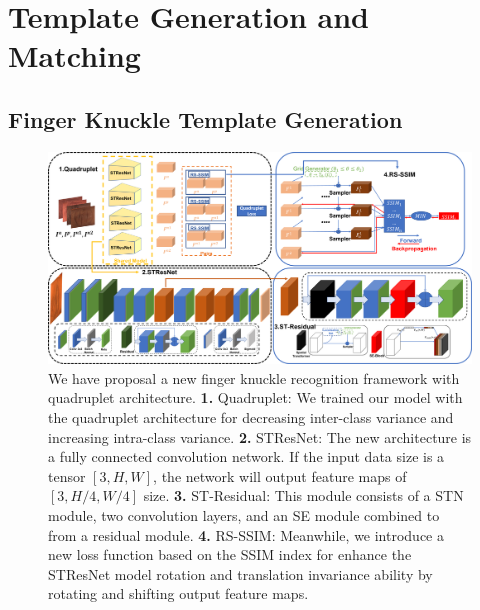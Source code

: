 \section{Template Generation and Matching\label{template-generation}}

\subsection{Finger Knuckle Template Generation\label{fk-template}}

\begin{figure}
    \centering
    \includegraphics[width=6.5in]{Figures/framework/ST-Residual/Framework.png}
    \caption{We have proposal a new finger knuckle recognition framework with quadruplet architecture. \textbf{1.} Quadruplet: We trained our model with the quadruplet architecture \cite{chen2017beyond} for decreasing inter-class variance and increasing intra-class variance. \textbf{2.} STResNet: The new architecture is a fully connected convolution network. If the input data size is a tensor $[3, H, W]$, the network will output feature maps of $[3, H/4, W/4]$ size. \textbf{3.} ST-Residual: This module consists of a STN \cite{jaderberg2015spatial} module, two convolution layers, and an SE \cite{hu2018squeeze} module combined to from a residual module.
     \textbf{4.} RS-SSIM: Meanwhile, we introduce a new loss function based on the SSIM index for enhance the STResNet model rotation and translation invariance ability by rotating and shifting output feature maps.}
    \label{framework}
\end{figure}

